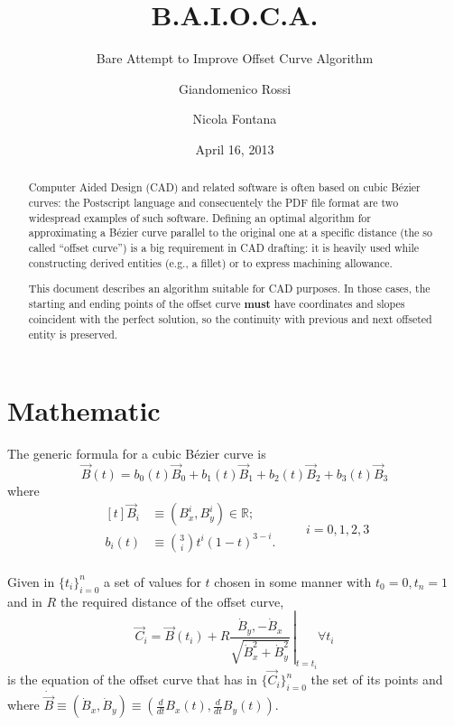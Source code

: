 \documentclass{scrartcl}
\title{B.A.I.O.C.A.}
\subtitle{Bare Attempt to Improve Offset Curve Algorithm}
\author{Giandomenico Rossi \and Nicola Fontana}
\date{April 16, 2013}
\newcommand\V[1]{\vec{#1}}
\newcommand\D[1]{\dot{#1}}
\newcommand\DV[1]{\D{\V{#1}}}
\begin{document}
\maketitle

\begin{abstract}
Computer Aided Design (CAD) and related software is often based on cubic
Bézier curves: the Postscript language and consecuentely the PDF file
format are two widespread examples of such software. Defining an optimal
algorithm for approximating a Bézier curve parallel to the original one
at a specific distance (the so called ``offset curve'') is a big
requirement in CAD drafting: it is heavily used while constructing
derived entities (e.g., a fillet) or to express machining allowance.

This document describes an algorithm suitable for CAD purposes. In those
cases, the starting and ending points of the offset curve \textbf{must}
have coordinates and slopes coincident with the perfect solution, so the
continuity with previous and next offseted entity is preserved.
\end{abstract}

\section{Mathematic}

The generic formula for a cubic Bézier curve is
\begin{equation*}
\V{B}(t) = b_0(t)\V{B}_0 + b_1(t)\V{B}_1 + b_2(t)\V{B}_2 + b_3(t)\V{B}_3
\end{equation*}
where
\begin{equation*}
\begin{aligned}[t]
\V{B}_i &\equiv ( B^i_x, B^i_y ) \in \mathbb{R}; \\
b_i(t)  &\equiv \binom{3}{i} t^i (1-t)^{3-i}. \\
\end{aligned}
\qquad i = 0,1,2,3
\end{equation*}

Given in $\{t_i\}_{i=0}^n$ a set of values for $t$ chosen in some
manner with $t_0=0, t_n=1$ and in $R$ the required distance of the offset
curve,
\begin{equation}\label{eq:Ci}
\V{C}_i = \V{B}(t_i) + R \left.
\frac{\D{B}_y, -\D{B}_x}{\sqrt{\D{B}_x^2 + \D{B}_y^2}}
    \,\right|_{t=t_i} \forall t_i
\end{equation}
is the equation of the offset curve that has in $\{\V{C}_i\}_{i=0}^n$ the
set of its points and where $\DV{B} \equiv ( \D{B}_x, \D{B}_y ) \equiv
\left( \frac{d}{dt} B_x(t), \frac{d}{dt} B_y(t) \right)$.
\end{document}
